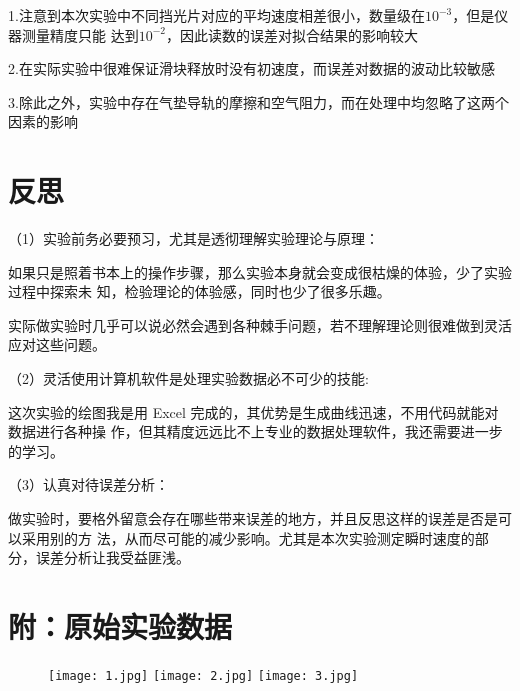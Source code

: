 \documentclass[11pt,a4paper]{article}
\begin{document}
    1.注意到本次实验中不同挡光片对应的平均速度相差很小，数量级在$10^{-3}$，但是仪器测量精度只能
    达到$10^{-2}$，因此读数的误差对拟合结果的影响较大

    2.在实际实验中很难保证滑块释放时没有初速度，而误差对数据的波动比较敏感

    3.除此之外，实验中存在气垫导轨的摩擦和空气阻力，而在处理中均忽略了这两个因素的影响



\section{反思}
    （1）实验前务必要预习，尤其是透彻理解实验理论与原理：

    如果只是照着书本上的操作步骤，那么实验本身就会变成很枯燥的体验，少了实验过程中探索未
    知，检验理论的体验感，同时也少了很多乐趣。

    实际做实验时几乎可以说必然会遇到各种棘手问题，若不理解理论则很难做到灵活应对这些问题。

    （2）灵活使用计算机软件是处理实验数据必不可少的技能:

    这次实验的绘图我是用 Excel 完成的，其优势是生成曲线迅速，不用代码就能对数据进行各种操
    作，但其精度远远比不上专业的数据处理软件，我还需要进一步的学习。

    （3）认真对待误差分析：

    做实验时，要格外留意会存在哪些带来误差的地方，并且反思这样的误差是否是可以采用别的方
    法，从而尽可能的减少影响。尤其是本次实验测定瞬时速度的部分，误差分析让我受益匪浅。

\section*{附：原始实验数据}
    \begin{figure}[H]
        \centering
        \texttt{[image: 1.jpg]}
        \texttt{[image: 2.jpg]}
        \texttt{[image: 3.jpg]}
    \end{figure}
\end{document}
